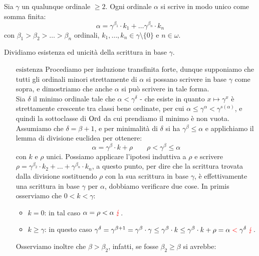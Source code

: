 \begin{exercise}
	Sia $\gamma$ un qualunque ordinale $\geq 2$. Ogni ordinale $\alpha$ si scrive in modo unico come somma finita:
	\[ \alpha = \gamma^{\beta_1}\cdot k_1 + \ldots \gamma^{\beta_n}\cdot k_n
		\]
	con $\beta_1 > \beta_2 > \ldots > \beta_n$ ordinali, $k_1,\ldots,k_n \in \gamma\setminus\{0\}$ e $n \in \omega$.
\end{exercise}

\begin{soln}
	Dividiamo esistenza ed unicità della scrittura in base $\gamma$.
	\begin{itemize}
		\item[$\boxed{\text{esistenza}}$] Procediamo per induzione transfinita forte, dunque supponiamo che tutti gli ordinali minori strettamente di $\alpha$ si possano scrivere in base $\gamma$ come sopra, e dimostriamo che anche $\alpha$ si può scrivere in tale forma.\\
		Sia $\delta$ il minimo ordinale tale che $\alpha < \gamma^\delta$ - che esiste in quanto $x \mapsto \gamma^x$ è strettamente crescente tra classi bene ordinate, per cui $\alpha \leq \gamma^\alpha < \gamma^{s(\alpha)}$, e quindi la sottoclasse di $\operatorname{Ord}$ da cui prendiamo il minimo è non vuota.
		Assumiamo che $\delta = \beta + 1$, e per minimalità di $\delta$ si ha $\gamma^\beta \leq \alpha$ e applichiamo il lemma di divisione euclidea per ottenere:
		\[ \alpha = \gamma^\beta \cdot k + \rho \qquad \rho < \gamma^\beta \leq \alpha
			\]
		con $k$ e $\rho$ unici. Possiamo applicare l'ipotesi induttiva a $\rho$ e scrivere $\rho = \gamma^{\beta_2}\cdot k_2 + \ldots + \gamma^{\beta_n} \cdot k_n$, a questo punto, per dire che la scrittura trovata dalla divisione sostituendo $\rho$ con la sua scrittura in base $\gamma$,
		è effettivamente una scrittura in base $\gamma$ per $\alpha$, dobbiamo verificare due cose. In primis osserviamo che $0 < k < \gamma$:
		\begin{itemize}
			\item \underline{$k = 0$}: in tal caso $\alpha = \rho < \alpha \; \textcolor{red}\lightning$.
			\item \underline{$k \geq \gamma$}: in questo caso $\gamma^\delta = \gamma^{\beta + 1} = \gamma^\beta \cdot \gamma \leq \gamma^\beta \cdot k \leq \gamma^\beta \cdot k + \rho = \alpha \;\textcolor{red}<\; \gamma^\delta \; \textcolor{red}\lightning$. 
		\end{itemize}
		Osserviamo inoltre che $\beta > \beta_2$, infatti, se fosse $\beta_2 \geq \beta$ si avrebbe:

\end{itemize}
\end{soln}
